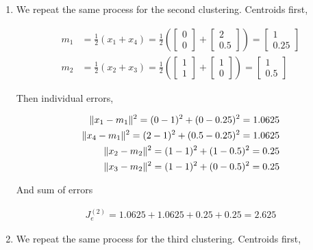 \documentclass[a4paper, 10pt, twoside]{article}
\begin{document}
\begin{enumerate}
	\item We repeat the same process for the second clustering. Centroids first,

	      \begin{align*}
		      m_1 & =
		      \frac{1}{2} (x_1 + x_4) =
		      \frac{1}{2} \left(
		      \begin{bmatrix} 0 \\ 0 \end{bmatrix} +
		      \begin{bmatrix} 2 \\ 0.5 \end{bmatrix}
		      \right)                  =
		      \begin{bmatrix} 1 \\ 0.25 \end{bmatrix} \\
		      m_2 & =
		      \frac{1}{2} (x_2 + x_3) =
		      \frac{1}{2} \left(
		      \begin{bmatrix} 1 \\ 1 \end{bmatrix} +
		      \begin{bmatrix} 1 \\ 0 \end{bmatrix}
		      \right)                 =
		      \begin{bmatrix} 1 \\ 0.5 \end{bmatrix}
	      \end{align*}

	      Then individual errors,

	      \begin{align*}
		      \Vert x_1 - m_1 \Vert^2 = (0-1)^2 + (0-0.25)^2 = 1.0625   \\
		      \Vert x_4 - m_1 \Vert^2 = (2-1)^2 + (0.5-0.25)^2 = 1.0625 \\
		      \Vert x_2 - m_2 \Vert^2 = (1-1)^2 + (1-0.5)^2 = 0.25      \\
		      \Vert x_3 - m_2 \Vert^2 = (1-1)^2 + (0-0.5)^2 = 0.25      \\
	      \end{align*}

	      And sum of errors

	      \begin{align*}
		      J_e^{(2)} = 1.0625 + 1.0625 + 0.25 + 0.25 = 2.625
	      \end{align*}

	\item We repeat the same process for the third clustering. Centroids first,


\end{enumerate}
\end{document}
